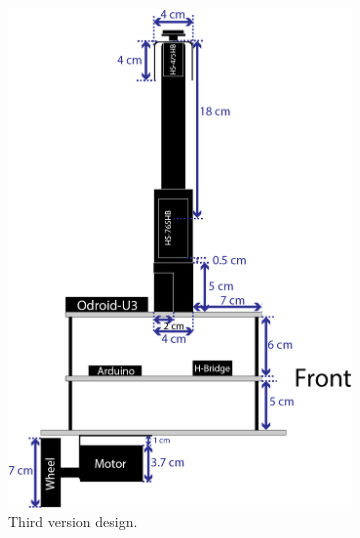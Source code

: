 \begin{figure}[h]
\begin{subfigure}[c]{0.3\textwidth}
	\includegraphics[width=\textwidth]{./Images/upperFourthD.png}
	\caption{Third version design.}
	\label{fig:triskar-third-design}
	\end{subfigure}
	\begin{subfigure}[c]{0.3\textwidth}
	\centering

\end{subfigure}
\end{figure}

